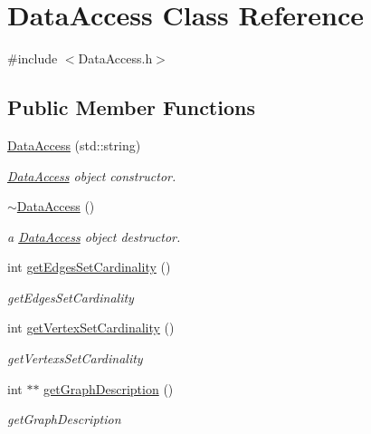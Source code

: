 \hypertarget{classDataAccess}{}\section{Data\+Access Class Reference}
\label{classDataAccess}


{\ttfamily \#include $<$Data\+Access.\+h$>$}

\subsection*{Public Member Functions}
\begin{DoxyCompactItemize}
\item 
\mbox{\label{classDataAccess_a04807758ef78f1185ced5899a9228cdf}} 
\hyperlink{classDataAccess_a04807758ef78f1185ced5899a9228cdf}{Data\+Access} (std\+::string)
\begin{DoxyCompactList}\small\item\em \hyperlink{classDataAccess}{Data\+Access} object constructor. \end{DoxyCompactList}\item 
\mbox{\label{classDataAccess_a02d65c4dff5b263dddb2d90d695fbe0e}} 
\hyperlink{classDataAccess_a02d65c4dff5b263dddb2d90d695fbe0e}{$\sim$\+Data\+Access} ()
\begin{DoxyCompactList}\small\item\em a \hyperlink{classDataAccess}{Data\+Access} object destructor. \end{DoxyCompactList}\item 
int \hyperlink{classDataAccess_a4a7294fd145e7b5f35fe2c94650e1a33}{get\+Edges\+Set\+Cardinality} ()
\begin{DoxyCompactList}\small\item\em get\+Edges\+Set\+Cardinality \end{DoxyCompactList}\item 
int \hyperlink{classDataAccess_a9dc2cc788a35c1c681df392ab83c01d1}{get\+Vertex\+Set\+Cardinality} ()
\begin{DoxyCompactList}\small\item\em get\+Vertexs\+Set\+Cardinality \end{DoxyCompactList}\item 
int $\ast$$\ast$ \hyperlink{classDataAccess_a94d6b0617c74a6f8f2c66f05caa0a7f0}{get\+Graph\+Description} ()
\begin{DoxyCompactList}\small\item\em get\+Graph\+Description \end{DoxyCompactList}\item 
$$
\end{DoxyCompactItemize}
